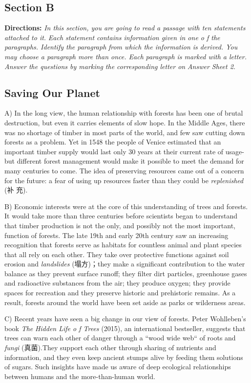 \documentclass[UTF8,11pt]{ctexart}
\begin{document}
\subsection*{\textbf{Section B}}


\textbf{Directions: }\textit{In this section, you are going to read a passage with ten statements attached to it.} \textit{Each statement contains information given in one o f the paragraphs. Identify the paragraph} \textit{from which the information is derived. You may choose a paragraph more than once. Each} \textit{paragraph is marked with a letter. Answer the questions by marking the corresponding letter on} \textit{Answer Sheet 2.}


\subsection*{\textbf{Saving Our Planet}}


A) In the long view, the human relationship with forests has been one of brutal destruction, but even it carries elements of slow hope. In the Middle Ages, there was no shortage of timber in most parts of the world, and few saw cutting down forests as a problem. Yet in 1548 the people of Venice estimated that an important timber supply would last only 30 years at their current rate of usage- but different forest management would make it possible to meet the demand for many centuries to come. The idea of preserving resources came out of a concern for the future: a fear of using up resources faster than they could be \textit{replenished} (补 充).


B) Economic interests were at the core of this understanding of trees and forests. It would take more than three centuries before scientists began to understand that timber production is not the only, and possibly not the most important, function of forests. The late 19th and early 20th century saw an increasing recognition that forests serve as habitats for countless animal and plant species that all rely on each other. They take over protective functions against soil erosion and \textit{landslides} (塌方)；they make a significant contribution to the water balance as they prevent surface runoff; they filter dirt particles, greenhouse gases and radioactive substances from the air; they produce oxygen; they provide spaces for recreation and they preserve historic and prehistoric remains. As a result, forests around the world have been set aside as parks or wilderness areas.


C) Recent years have seen a big change in our view of forests. Peter Wohlleben's book \textit{The} \textit{Hidden Life o f Trees} (2015), an international bestseller, suggests that trees can warn each other of danger through a “wood wide web“ of roots and \textit{fungi} (真菌).They support each other through sharing of nutrients and information, and they even keep ancient stumps alive by feeding them solutions of sugars. Such insights have made us aware of deep ecological relationships between humans and the more-than-human world.
\end{document}
